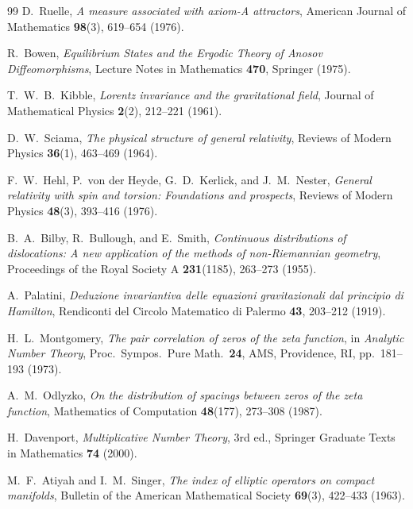 \documentclass[11pt,a4paper]{article}
\theoremstyle{plain}
\theoremstyle{definition}
\theoremstyle{remark}
\begin{document}
\begin{thebibliography}{99}
D.~Ruelle,
\textit{A measure associated with axiom-A attractors},
American Journal of Mathematics \textbf{98}(3), 619--654 (1976).

R.~Bowen,
\textit{Equilibrium States and the Ergodic Theory of Anosov Diffeomorphisms},
Lecture Notes in Mathematics \textbf{470}, Springer (1975).

T.~W.~B.~Kibble,
\textit{Lorentz invariance and the gravitational field},
Journal of Mathematical Physics \textbf{2}(2), 212--221 (1961).

D.~W.~Sciama,
\textit{The physical structure of general relativity},
Reviews of Modern Physics \textbf{36}(1), 463--469 (1964).

F.~W.~Hehl, P.~von der Heyde, G.~D.~Kerlick, and J.~M.~Nester,
\textit{General relativity with spin and torsion: Foundations and prospects},
Reviews of Modern Physics \textbf{48}(3), 393--416 (1976).

B.~A.~Bilby, R.~Bullough, and E.~Smith,
\textit{Continuous distributions of dislocations: A new application of the methods of non-Riemannian geometry},
Proceedings of the Royal Society A \textbf{231}(1185), 263--273 (1955).

A.~Palatini,
\textit{Deduzione invariantiva delle equazioni gravitazionali dal principio di Hamilton},
Rendiconti del Circolo Matematico di Palermo \textbf{43}, 203--212 (1919).

H.~L.~Montgomery,
\textit{The pair correlation of zeros of the zeta function},
in \textit{Analytic Number Theory}, Proc.\ Sympos.\ Pure Math.\ \textbf{24},
AMS, Providence, RI, pp.~181--193 (1973).

A.~M.~Odlyzko,
\textit{On the distribution of spacings between zeros of the zeta function},
Mathematics of Computation \textbf{48}(177), 273--308 (1987).

H.~Davenport,
\textit{Multiplicative Number Theory},
3rd ed., Springer Graduate Texts in Mathematics \textbf{74} (2000).

M.~F.~Atiyah and I.~M.~Singer,
\textit{The index of elliptic operators on compact manifolds},
Bulletin of the American Mathematical Society \textbf{69}(3), 422--433 (1963).


\end{thebibliography}
\end{document}
